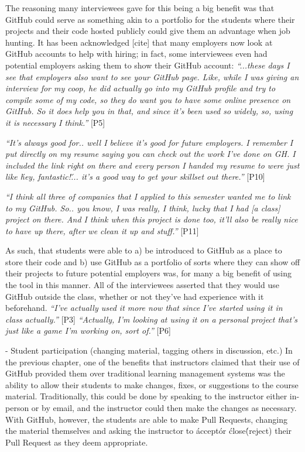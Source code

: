 The reasoning many interviewees gave for this being a big benefit was that GitHub could serve as something akin to a portfolio for the students where their projects and their code hosted publicly could give them an advantage when job hunting. It has been acknowledged [cite] that many employers now look at GitHub accounts to help with hiring; in fact, some interviewees even had potential employers asking them to show their GitHub account: \textit{``...these days I see that employers also want to see your GitHub page. Like, while I was giving an interview for my coop, he did actually go into my GitHub profile and try to compile some of my code, so they do want you to have some online presence on GitHub. So it does help you in that, and since it's been used so widely, so, using it is necessary I think.''} [P5]

\textit{``It's always good for.. well I believe it's good for future employers. I remember I put directly on my resume saying you can check out the work I've done on GH. I included the link right on there and every person I handed my resume to were just like \'hey, fantastic!\'... it's a good way to get your skillset out there.''} [P10]

\textit{``I think all three of companies that I applied to this semester wanted me to link to my GitHub. So.. you know, I was really, I think, lucky that I had [a class] project on there. And I think when this project is done too, it'll also be really nice to have up there, after we clean it up and stuff.''} [P11]

As such, that students were able to a) be introduced to GitHub as a place to store their code and b) use GitHub as a portfolio of sorts where they can show off their projects to future potential employers was, for many a big benefit of using the tool in this manner. All of the interviewees asserted that they would use GitHub outside the class, whether or not they've had experience with it beforehand. \textit{``I've actually used it more now that since I've started using it in class actually.''} [P3] \textit{``Actually, I'm looking at using it on a personal project that's just like a game I'm working on, sort of.''} [P6]

- Student participation (changing material, tagging others in discussion, etc.)
In the previous chapter, one of the benefits that instructors claimed that their use of GitHub provided them over traditional learning management systems was the ability to allow their students to make changes, fixes, or suggestions to the course material. Traditionally, this could be done by speaking to the instructor either in-person or by email, and the instructor could then make the changes as necessary. With GitHub, however, the students are able to make Pull Requests, changing the material themselves and asking the instructor to \'accept\' or \'close\' (reject) their Pull Request as they deem appropriate.

